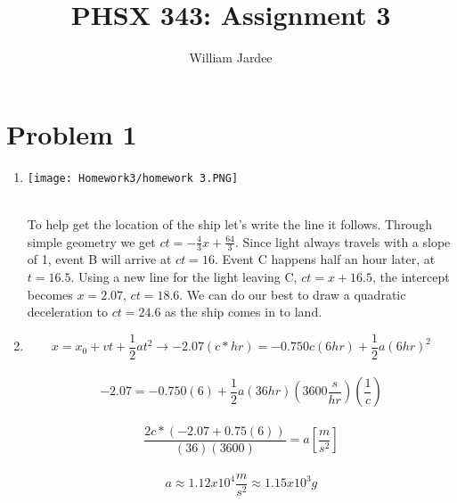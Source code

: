 \documentclass[11pt]{article}
\begin{document}
\date{}

\title{PHSX 343: Assignment 3}

\author{William Jardee}

\maketitle


\section*{Problem 1}

\begin{enumerate}[label=\alph*)]
  \item 
  \parbox{}{\texttt{[image: Homework3/homework 3.PNG]}}\\
  
 To help get the location of the ship let's write the line it follows. Through simple geometry we get $ct=-\frac{4}{3}x+\frac{64}{3}$. Since light always travels with a slope of 1, event B will arrive at $ct = 16$. Event C happens half an hour later, at $t = 16.5$. Using a new line for the light leaving C, $ct = x+16.5$, the intercept becomes $x=2.07$, $ct = 18.6$. We can do our best to draw a quadratic deceleration to $ct = 24.6$ as the ship comes in to land. 
 
\item
\[x = x_0 +vt+\frac{1}{2}at^2 \rightarrow -2.07 (c*hr) = -0.750c(6hr) +\frac{1}{2}a(6hr)^2\]\\
 \[-2.07 = -0.750(6)+\frac{1}{2}a(36hr)\left(3600\frac{s}{hr}\right)\left( \frac{1}{c}\right) \]\\
 \[\frac{2c*(-2.07+0.75(6))}{(36)(3600)} = a \left[\frac{m}{s^2}\right]\]\\
 \[a \approx 1.12x10^4 \frac{m}{s^2} \approx 1.15x10^3 g\]
\end{enumerate}
\end{document}
